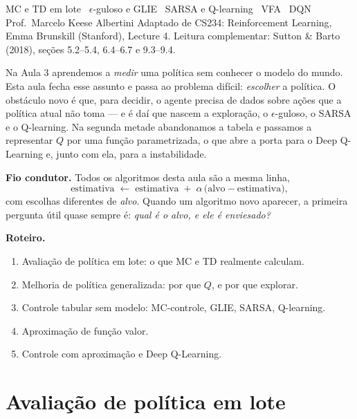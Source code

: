 \documentclass[11pt]{article}
\begin{document}
     {MC e TD em lote \textbullet\ $\epsilon$-guloso e GLIE \textbullet\ SARSA e Q-learning \textbullet\ VFA \textbullet\ DQN}
     {Prof.\ Marcelo Keese Albertini}
     {Adaptado de CS234: Reinforcement Learning, Emma Brunskill (Stanford), Lecture 4. Leitura complementar: Sutton \& Barto (2018), seções 5.2--5.4, 6.4--6.7 e 9.3--9.4.}

\noindent
Na Aula 3 aprendemos a \emph{medir} uma política sem conhecer o modelo do mundo.
Esta aula fecha esse assunto e passa ao problema difícil: \emph{escolher} a
política. O obstáculo novo é que, para decidir, o agente precisa de dados sobre
ações que a política atual não toma --- e é daí que nascem a exploração, o
$\epsilon$-guloso, o SARSA e o Q-learning. Na segunda metade abandonamos a
tabela e passamos a representar $Q$ por uma função parametrizada, o que abre a
porta para o Deep Q-Learning e, junto com ela, para a instabilidade.

\begin{ideiabox}
  \textbf{Fio condutor.} Todos os algoritmos desta aula são a mesma linha,
  \[ \text{estimativa} \;\leftarrow\; \text{estimativa} \;+\; \alpha\,\bigl(\text{alvo} - \text{estimativa}\bigr), \]
  com escolhas diferentes de \emph{alvo}. Quando um algoritmo novo aparecer, a
  primeira pergunta útil quase sempre é: \emph{qual é o alvo, e ele é
  enviesado?}
\end{ideiabox}

\medskip
\noindent\textbf{Roteiro.}
\begin{enumerate}[label=\textcolor{rlLaranja}{\bfseries\arabic*.}, leftmargin=1.6em, itemsep=0.1em]
  \item Avaliação de política em lote: o que MC e TD realmente calculam.
  \item Melhoria de política generalizada: por que $Q$, e por que explorar.
  \item Controle tabular sem modelo: MC-controle, GLIE, SARSA, Q-learning.
  \item Aproximação de função valor.
  \item Controle com aproximação e Deep Q-Learning.
\end{enumerate}

\section{Avaliação de política em lote}
\end{document}
